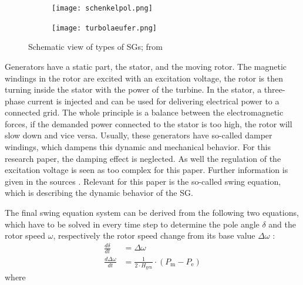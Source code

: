 \begin{figure}[H]
        \centering
        \begin{subfigure}[b]{.49\textwidth}
                \centering
                \texttt{[image: schenkelpol.png]}
        \end{subfigure}
        \begin{subfigure}[b]{.49\textwidth}
                \centering
                \texttt{[image: turbolaeufer.png]}
        \end{subfigure}
        \caption[Types of \acfp{SG}]{Schematic view of types of \acfp{SG}; from \autocite{oedingElektrischeKraftwerkeUnd2016}}
        \label{fig:generators}
\end{figure}

Generators have a static part, the stator, and the moving rotor. The magnetic windings in the rotor are excited with an excitation voltage, the rotor is then turning inside the stator with the power of the turbine. In the stator, a three-phase current is injected and can be used for delivering electrical power to a connected grid. The whole principle is a balance between the electromagnetic forces, if the demanded power connected to the stator is too high, the rotor will slow down and vice versa. Usually, these generators have so-called damper windings, which dampens this dynamic and mechanical behavior. For this research paper, the damping effect is neglected. As well the regulation of the excitation voltage is seen as too complex for this paper. Further information is given in the sources \autocite{machowskiPowerSystemDynamics2020,kundurPowerSystemStability2022,oedingElektrischeKraftwerkeUnd2016,schwabElektroenergiesystemeSmarteStromversorgung2022}. Relevant for this paper is the so-called swing equation, which is describing the dynamic behavior of the \acs{SG}.

The final swing equation system can be derived from the following two equations, which have to be solved in every time step to determine the pole angle $\delta$ and the rotor speed $\omega$, respectively the rotor speed change from its base value $\Delta\omega$ \autocite{machowskiPowerSystemDynamics2020,kundurPowerSystemStability2022}:
\begin{align}
        \frac{d\delta}{dt}       & =\Delta\omega \label{eq:swing1}                                                         \\[12pt]
        \frac{d\Delta\omega}{dt} & =\frac{1}{2 \cdot H_\mathrm{gen}} \cdot (P_\mathrm{m} - P_\mathrm{e}) \label{eq:swing2}
\end{align}
where

